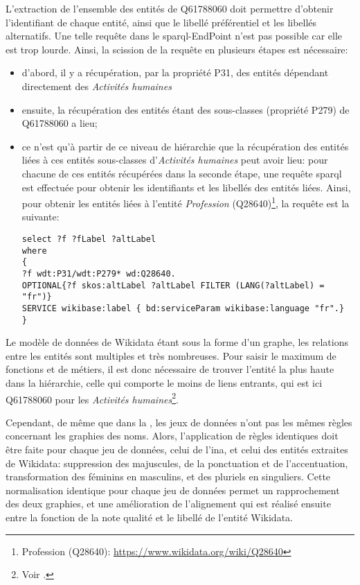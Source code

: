 L'extraction de l'ensemble des entités de Q61788060 doit permettre d'obtenir l'identifiant de chaque entité, ainsi que le libellé préférentiel et les libellés alternatifs. Une telle requête dans le \ac{sparql}-EndPoint n'est pas possible car elle est trop lourde. Ainsi, la scission de la requête en plusieurs étapes est nécessaire:
\begin{itemize}
	\item d'abord, il y a récupération, par la propriété P31, des entités dépendant directement des \textit{Activités humaines}
	\item ensuite, la récupération des entités étant des sous-classes (propriété P279) de Q61788060 a lieu;
	\item ce n'est qu'à partir de ce niveau de hiérarchie que la récupération des entités liées à ces entités sous-classes d'\textit{Activités humaines} peut avoir lieu: pour chacune de ces entités récupérées dans la seconde étape, une requête \ac{sparql} est effectuée pour obtenir les identifiants et les libellés des entités liées.
	Ainsi, pour obtenir les entités liées à l'entité \textit{Profession} (Q28640)\footnote{Profession (Q28640): \url{https://www.wikidata.org/wiki/Q28640}}, la requête est la suivante:
	\begin{verbatim}
select ?f ?fLabel ?altLabel
where
{
?f wdt:P31/wdt:P279* wd:Q28640.
OPTIONAL{?f skos:altLabel ?altLabel FILTER (LANG(?altLabel) = "fr")}
SERVICE wikibase:label { bd:serviceParam wikibase:language "fr".}
}
	\end{verbatim}
\end{itemize}
\medskip
Le modèle de données de Wikidata étant sous la forme d'un graphe, les relations entre les entités sont multiples et très nombreuses. Pour saisir le maximum de fonctions et de métiers, il est donc nécessaire de trouver l'entité la plus haute dans la hiérarchie, celle qui comporte le moins de liens entrants, qui est ici Q61788060 pour les \textit{Activités humaines}\footnote{Voir .}.



Cependant, de même que dans la , les jeux de données n'ont pas les mêmes règles concernant les graphies des noms. Alors, l'application de règles identiques doit être faite pour chaque jeu de données, celui de l'\ac{ina}, et celui des entités extraites de Wikidata: suppression des majuscules, de la ponctuation et de l'accentuation, transformation des féminins en masculins, et des pluriels en singuliers. Cette normalisation identique pour chaque jeu de données permet un rapprochement des deux graphies, et une amélioration de l'alignement qui est réalisé ensuite entre la fonction de la note qualité et le libellé de l'entité Wikidata.

